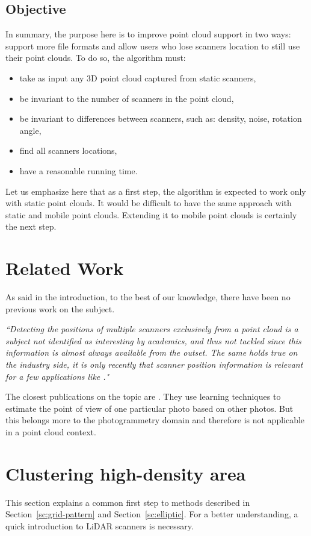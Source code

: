 \subsection{Objective}
In summary, the purpose here is to improve \CC point cloud support in two ways: support more file formats and allow users who lose scanners location to still use their point clouds. To do so, the algorithm must:
\begin{itemize}
  \item take as input any 3D point cloud captured from static scanners,
  \item be invariant to the number of scanners in the point cloud,
  \item be invariant to differences between scanners, such as: density, noise, rotation angle,
  \item find all scanners locations,
  \item have a reasonable running time.
\end{itemize}

Let us emphasize here that as a first step, the algorithm is expected to work only with static point clouds. It would be difficult to have the same approach with static and mobile point clouds. Extending it to mobile point clouds is certainly the next step.



\section{Related Work}
\label{sc:related-scanfinder}
As said in the introduction, to the best of our knowledge, there have been no previous work on the subject.

\emph{``Detecting the positions of multiple scanners exclusively from a point cloud is a subject not identified as interesting by academics, and thus not tackled since this information is almost always available from the outset. The same holds true on the industry side, it is only recently that scanner position information is relevant for a few applications like \CC."}

The closest publications on the topic are \cite{ml1, ml2, ml3, ml4, ml5}. They use learning techniques to estimate the point of view of one particular photo based on other photos. But this belongs more to the photogrammetry domain and therefore is not applicable in a point cloud context.



\section{Clustering high-density area}
\label{sc:highdens}
This section explains a common first step to methods described in Section~\ref{sc:grid-pattern} and Section~\ref{sc:elliptic}. For a better understanding, a quick introduction to LiDAR scanners is necessary.

